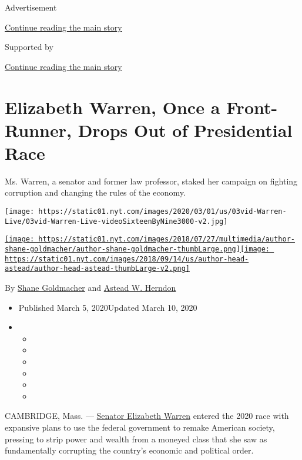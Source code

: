 Advertisement

\protect\hyperlink{after-top}{Continue reading the main story}

Supported by

\protect\hyperlink{after-sponsor}{Continue reading the main story}

\hypertarget{elizabeth-warren-once-a-front-runner-drops-out-of-presidential-race}{%
\section{Elizabeth Warren, Once a Front-Runner, Drops Out of
Presidential
Race}\label{elizabeth-warren-once-a-front-runner-drops-out-of-presidential-race}}

Ms. Warren, a senator and former law professor, staked her campaign on
fighting corruption and changing the rules of the economy.

\texttt{[image: https://static01.nyt.com/images/2020/03/01/us/03vid-Warren-Live/03vid-Warren-Live-videoSixteenByNine3000-v2.jpg]}

\href{https://www.nytimes.com/by/shane-goldmacher}{\texttt{[image: https://static01.nyt.com/images/2018/07/27/multimedia/author-shane-goldmacher/author-shane-goldmacher-thumbLarge.png]}}\href{https://www.nytimes.com/by/astead-w-herndon}{\texttt{[image: https://static01.nyt.com/images/2018/09/14/us/author-head-astead/author-head-astead-thumbLarge-v2.png]}}

By \href{https://www.nytimes.com/by/shane-goldmacher}{Shane Goldmacher}
and \href{https://www.nytimes.com/by/astead-w-herndon}{Astead W.
Herndon}

\begin{itemize}
\item
  Published March 5, 2020Updated March 10, 2020
\item
  \begin{itemize}
  \item
  \item
  \item
  \item
  \item
  \item
  \end{itemize}
\end{itemize}

CAMBRIDGE, Mass. ---
\href{https://www.nytimes.com/2020/03/10/podcasts/the-daily/warren.html?action=click\&module=Briefings\&pgtype=Homepage}{Senator
Elizabeth Warren} entered the 2020 race with expansive plans to use the
federal government to remake American society, pressing to strip power
and wealth from a moneyed class that she saw as fundamentally corrupting
the country's economic and political order.


